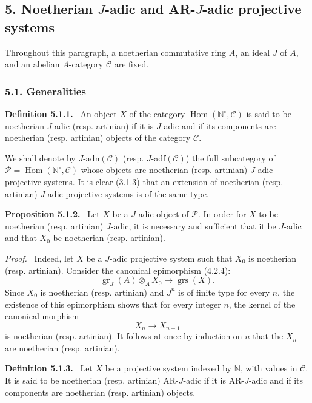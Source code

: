 \documentclass[11pt]{article}
\newenvironment{statement}[1]{\par\medskip\noindent\textbf{#1.}\ }{\par\medskip}
\newenvironment{prooftext}[1][Proof]{\par\noindent\emph{#1.}\ }{\par\medskip}
\DeclareMathOperator{\Hom}{Hom}
\providecommand{\gr}{\operatorname{gr}}
\providecommand{\Hom}{\operatorname{Hom}}
\providecommand{\gr}{\operatorname{gr}}
\providecommand{\gr}{\operatorname{gr}}
\providecommand{\grs}{\operatorname{grs}}
\providecommand{\Hom}{\operatorname{Hom}}
\begin{document}
\subsection*{5. Noetherian \(J\)-adic and AR-\(J\)-adic projective systems}

Throughout this paragraph, a noetherian commutative ring \(A\), an ideal \(J\) of \(A\), and an abelian \(A\)-category \(\mathcal C\) are fixed.

\subsubsection*{5.1. Generalities}

\begin{statement}{Definition 5.1.1}
An object \(X\) of the category \(\Hom(\mathbb N^\circ,\mathcal C)\) is said to be noetherian \(J\)-adic (resp. artinian) if it is \(J\)-adic and if its components are noetherian (resp. artinian) objects of the category \(\mathcal C\).
\end{statement}

We shall denote by \(J\)-adn\((\mathcal C)\) (resp. \(J\)-adf\((\mathcal C)\)) the full subcategory of
\(\mathcal P=\Hom(\mathbb N^\circ,\mathcal C)\) whose objects are noetherian (resp. artinian) \(J\)-adic projective systems. It is clear (3.1.3) that an extension of noetherian (resp. artinian) \(J\)-adic projective systems is of the same type.

\begin{statement}{Proposition 5.1.2}
Let \(X\) be a \(J\)-adic object of \(\mathcal P\). In order for \(X\) to be noetherian (resp. artinian) \(J\)-adic, it is necessary and sufficient that it be \(J\)-adic and that \(X_0\) be noetherian (resp. artinian).
\end{statement}

\begin{prooftext}
Indeed, let \(X\) be a \(J\)-adic projective system such that \(X_0\) is noetherian (resp. artinian). Consider the canonical epimorphism (4.2.4):
\[
\gr_J(A)\otimes_A X_0\longrightarrow \grs(X).
\]
Since \(X_0\) is noetherian (resp. artinian) and \(J^n\) is of finite type for every \(n\), the existence of this epimorphism shows that for every integer \(n\), the kernel of the canonical morphism
\[
X_n\longrightarrow X_{n-1}
\]
is noetherian (resp. artinian). It follows at once by induction on \(n\) that the \(X_n\) are noetherian (resp. artinian).
\end{prooftext}

\begin{statement}{Definition 5.1.3}
Let \(X\) be a projective system indexed by \(\mathbb N\), with values in \(\mathcal C\). It is said to be noetherian (resp. artinian) AR-\(J\)-adic if it is AR-\(J\)-adic and if its components are noetherian (resp. artinian) objects.
\end{statement}
\end{document}
